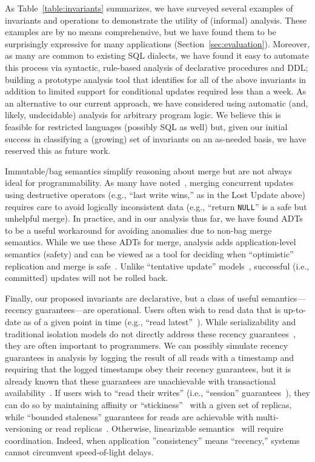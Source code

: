 As Table~\ref{table:invariants} summarizes, we have surveyed several
examples of invariants and operations to demonstrate the utility of
(informal) \iconfluence analysis. These examples are by no means
comprehensive, but we have found them to be surprisingly expressive
for many applications (Section~\ref{sec:evaluation}). Moreover, as
many are common to existing SQL dialects, we have found it easy to
automate this process via syntactic, rule-based analysis of
declarative procedures and DDL; building a prototype analysis tool
that identifies \iconfluence for all of the above invariants in
addition to limited support for conditional updates required less than
a week. As an alternative to our current approach, we have considered
using automatic (and, likely, undecidable) analysis for arbitrary
program logic. We believe this is feasible for restricted languages
(possibly SQL as well) but, given our initial success in classifying a
(growing) set of invariants on an as-needed basis, we have reserved
this as future work.

Immutable/bag semantics simplify reasoning about merge but are not
always ideal for programmability. As many have
noted~\cite{bayou,tamer-book,dynamo}, merging concurrent updates using
destructive operators (e.g., ``last write wins,'' as in the Lost
Update above) requires care to avoid logically inconsistent data
(e.g., ``return \texttt{NULL}'' is a safe but unhelpful merge). In
practice, and in our analysis thus far, we have found ADTs to be a
useful workaround for avoiding anomalies due to non-bag merge
semantics. While we use these ADTs for merge, \iconfluence analysis
adds application-level semantics (safety) and can be viewed as a tool
for deciding when ``optimistic'' replication and merge is
safe~\cite{optimistic}. Unlike ``tentative update''
models~\cite{tamer-book}, successful (i.e., committed) updates will
not be rolled back.

Finally, our proposed invariants are declarative, but a class of
useful semantics---recency guarantees---are operational. Users often
wish to read data that is up-to-date as of a given point in time
(e.g., ``read latest''~\cite{pnuts}). While serializability and
traditional isolation models do not directly address these recency
guarantees~\cite{adya-isolation}, they are often important to
programmers. We can possibly simulate recency guarantees in
\iconfluence analysis by logging the result of all reads with a
timestamp and requiring that the logged timestamps obey their recency
guarantees, but it is already known that these guarantees are
unachievable with transactional availability~\cite{hat-vldb}. If users
wish to ``read their writes'' (i.e., ``session''
guarantees~\cite{bayou}), they can do so by maintaining affinity or
``stickiness''~\cite{hat-vldb,vogels-defs} with a given set of
replicas, while ``bounded staleness'' guarantees for reads are
achievable with multi-versioning or read
replicas~\cite{pnuts}. Otherwise, linearizable
semantics~\cite{spanner} will require coordination. Indeed, when
application ''consistency'' means ``recency,'' systems cannot
circumvent speed-of-light delays.

